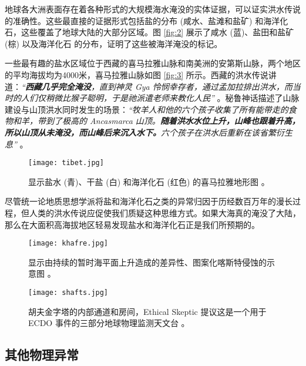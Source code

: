 \documentclass[10pt,twocolumn,letterpaper]{article}
\begin{document}
地球各大洲表面存在着各种形式的大规模海水淹没的实体证据，可以证实洪水传说的准确性。这些最直接的证据形式包括盐的分布 (咸水、盐滩和盐矿) 和海洋化石，这些覆盖了地球大陆的大部分区域。图 \ref{fig:2} 展示了咸水 (蓝)、盐田和盐矿 (棕) 以及海洋化石 \cite{15,16,86,87} 的分布，证明了这些被海洋淹没的标记。

一些最有趣的盐水区域位于西藏的喜马拉雅山脉和南美洲的安第斯山脉，两个地区的平均海拔均为4000米，喜马拉雅山脉如图 \ref{fig:3} 所示。西藏的洪水传说讲道：\textit{“\textbf{西藏几乎完全淹没}，直到神灵 Gya 怜悯幸存者，通过孟加拉排出洪水，而当时的人们仅稍微比猴子聪明，于是祂派遣老师来教化人民”} \cite{3}。秘鲁神话描述了山脉建设与山顶洪水同时发生的场景：\textit{“牧羊人和他的六个孩子收集了所有能带走的食物和羊，带到了极高的 Ancasmarca 山顶。\textbf{随着洪水水位上升，山峰也跟着升高，所以山顶从未淹没，而山峰后来沉入水下。}六个孩子在洪水后重新在该省繁衍生息”} \cite{3}。

\begin{figure}[t]
\begin{center}
   \texttt{[image: tibet.jpg]}
\end{center}
   \caption{显示盐水 (青)、干盐 (白) 和海洋化石 (红色) 的喜马拉雅地形图 \cite{15,16,86,87}。}
\label{fig:3}
\label{fig:onecol}
\end{figure}

尽管统一论地质思想学派将盐和海洋化石之类的异常归因于历经数百万年的漫长过程，但人类的洪水传说应促使我们质疑这种思维方式。如果大海真的淹没了大陆，那么在大面积高海拔地区轻易发现盐水和海洋化石正是我们所预期的。

\begin{figure*}[t]
\begin{center}
\texttt{[image: khafre.jpg]}
\end{center}
   \caption{显示由持续的暂时海平面上升造成的差异性、图案化喀斯特侵蚀的示意图 \cite{27}。}
\label{fig:4}
\end{figure*}

\begin{figure*}[t]
\begin{center}
\texttt{[image: shafts.jpg]}
\end{center}
   \caption{胡夫金字塔的内部通道和房间，Ethical Skeptic 提议这是一个用于 ECDO 事件的三部分地球物理监测天文台 \cite{28}。}
\label{fig:5}
\end{figure*}

\subsection{其他物理异常}
\end{document}
